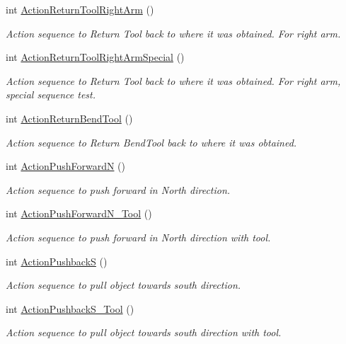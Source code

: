 \begin{DoxyCompactItemize}
int \hyperlink{structManipulate_a0bd90bbdd4f24ba6740da3e789210982}{Action\+Return\+Tool\+Right\+Arm} ()
\begin{DoxyCompactList}\small\item\em Action sequence to Return Tool back to where it was obtained. For right arm. \end{DoxyCompactList}\item 
int \hyperlink{structManipulate_a0ce9ec47f0cf4f42cdf0dfcf29387ebb}{Action\+Return\+Tool\+Right\+Arm\+Special} ()
\begin{DoxyCompactList}\small\item\em Action sequence to Return Tool back to where it was obtained. For right arm, special sequence test. \end{DoxyCompactList}\item 
int \hyperlink{structManipulate_a2a2cd9af2803118298b33008c27a295d}{Action\+Return\+Bend\+Tool} ()
\begin{DoxyCompactList}\small\item\em Action sequence to Return Bend\+Tool back to where it was obtained. \end{DoxyCompactList}\item 
int \hyperlink{structManipulate_a187b5b722ac34bb0718478120b0a4262}{Action\+Push\+ForwardN} ()
\begin{DoxyCompactList}\small\item\em Action sequence to push forward in North direction. \end{DoxyCompactList}\item 
int \hyperlink{structManipulate_a2ea0628e45e9350185fb172819448256}{Action\+Push\+Forward\+N\+\_\+\+Tool} ()
\begin{DoxyCompactList}\small\item\em Action sequence to push forward in North direction with tool. \end{DoxyCompactList}\item 
int \hyperlink{structManipulate_a1caf8c447479cbcdc346b0959bd5100f}{Action\+PushbackS} ()
\begin{DoxyCompactList}\small\item\em Action sequence to pull object towards south direction. \end{DoxyCompactList}\item 
int \hyperlink{structManipulate_a93385c3e5e0efd1524cde27fccfb6097}{Action\+Pushback\+S\+\_\+\+Tool} ()
\begin{DoxyCompactList}\small\item\em Action sequence to pull object towards south direction with tool. \end{DoxyCompactList}\item 

\end{DoxyCompactItemize}
